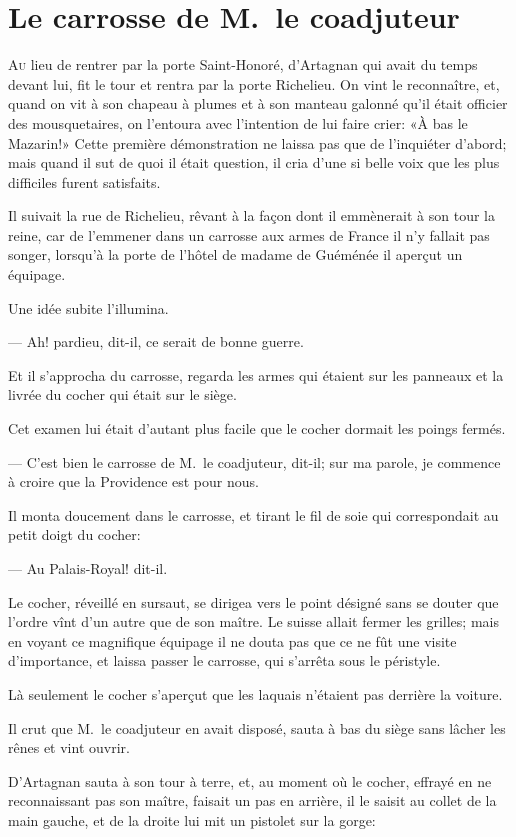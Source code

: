 \chapter{Le carrosse de M.~le coadjuteur}

\lettrine{A}{u} lieu de rentrer par la porte Saint-Honoré, d'Artagnan qui avait du temps devant lui, fit le tour et rentra par la porte Richelieu. On vint le reconnaître, et, quand on vit à son chapeau à plumes et à son manteau galonné qu'il était officier des mousquetaires, on l'entoura avec l'intention de lui faire crier: «À bas le Mazarin!» Cette première démonstration ne laissa pas que de l'inquiéter d'abord; mais quand il sut de quoi il était question, il cria d'une si belle voix que les plus difficiles furent satisfaits.

Il suivait la rue de Richelieu, rêvant à la façon dont il emmènerait à son tour la reine, car de l'emmener dans un carrosse aux armes de France il n'y fallait pas songer, lorsqu'à la porte de l'hôtel de madame de Guéménée il aperçut un équipage.

Une idée subite l'illumina.

— Ah! pardieu, dit-il, ce serait de bonne guerre.

Et il s'approcha du carrosse, regarda les armes qui étaient sur les panneaux et la livrée du cocher qui était sur le siège.

Cet examen lui était d'autant plus facile que le cocher dormait les poings fermés.

— C'est bien le carrosse de M.~le coadjuteur, dit-il; sur ma parole, je commence à croire que la Providence est pour nous.

Il monta doucement dans le carrosse, et tirant le fil de soie qui correspondait au petit doigt du cocher:

— Au Palais-Royal! dit-il.

Le cocher, réveillé en sursaut, se dirigea vers le point désigné sans se douter que l'ordre vînt d'un autre que de son maître. Le suisse allait fermer les grilles; mais en voyant ce magnifique équipage il ne douta pas que ce ne fût une visite d'importance, et laissa passer le carrosse, qui s'arrêta sous le péristyle.

Là seulement le cocher s'aperçut que les laquais n'étaient pas derrière la voiture.

Il crut que M.~le coadjuteur en avait disposé, sauta à bas du siège sans lâcher les rênes et vint ouvrir.

D'Artagnan sauta à son tour à terre, et, au moment où le cocher, effrayé en ne reconnaissant pas son maître, faisait un pas en arrière, il le saisit au collet de la main gauche, et de la droite lui mit un pistolet sur la gorge:

